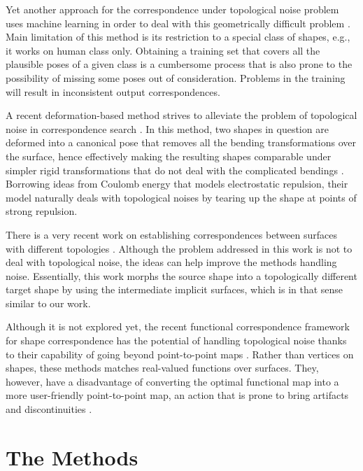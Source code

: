 \documentclass{egpubl}
\begin{document}
Yet another approach for the correspondence under topological noise problem uses machine learning in order to deal with this geometrically difficult problem \cite{Wei16}. Main limitation of this method is its restriction to a special class of shapes, e.g., it works on human class only. Obtaining a training set that covers all the plausible poses of a given class is a cumbersome process that is also prone to the possibility of missing some poses out of consideration. Problems in the training will result in inconsistent output correspondences.

A recent deformation-based method strives to alleviate the problem of topological noise in correspondence search \cite{Boscaini14}. In this method, two shapes in question are deformed into a canonical pose that removes all the bending transformations over the surface, hence effectively making the resulting shapes comparable under simpler rigid transformations that do not deal with the complicated bendings \cite{Besl92}. Borrowing ideas from Coulomb energy that models electrostatic repulsion, their model naturally deals with topological noises by tearing up the shape at points of strong repulsion.

There is a very recent work on establishing correspondences between surfaces with different topologies \cite{Park16}. Although the problem addressed in this work is not to deal with topological noise, the ideas can help improve the methods handling noise. Essentially, this work morphs the source shape into a topologically different target shape by using the intermediate implicit surfaces, which is in that sense similar to our work.

Although it is not explored yet, the recent functional correspondence framework for shape correspondence has the potential of handling topological noise thanks to their capability of going beyond point-to-point maps \cite{Ovsjanikov12}\cite{Huang14}. Rather than vertices on shapes, these methods matches real-valued functions over surfaces. They, however, have a disadvantage of converting the optimal functional map into a more user-friendly point-to-point map, an action that is prone to bring artifacts and discontinuities \cite{Ganapathi16}.

\section{The Methods}
\label{sec:method}


\end{document}
